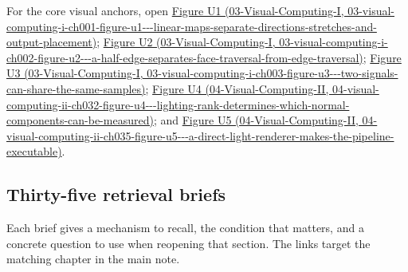 For the core visual anchors, open \href{../03-Visual-Computing-I/main.pdf\#nameddest=03-visual-computing-i-ch001-figure-u1---linear-maps-separate-directions-stretches-and-output-placement}{Figure U1 (03-Visual-Computing-I, 03-visual-computing-i-ch001-figure-u1-\/-\/-linear-maps-separate-directions-stretches-and-output-placement)}; \href{../03-Visual-Computing-I/main.pdf\#nameddest=03-visual-computing-i-ch002-figure-u2---a-half-edge-separates-face-traversal-from-edge-traversal}{Figure U2 (03-Visual-Computing-I, 03-visual-computing-i-ch002-figure-u2-\/-\/-a-half-edge-separates-face-traversal-from-edge-traversal)}; \href{../03-Visual-Computing-I/main.pdf\#nameddest=03-visual-computing-i-ch003-figure-u3---two-signals-can-share-the-same-samples}{Figure U3 (03-Visual-Computing-I, 03-visual-computing-i-ch003-figure-u3-\/-\/-two-signals-can-share-the-same-samples)}; \href{../04-Visual-Computing-II/main.pdf\#nameddest=04-visual-computing-ii-ch032-figure-u4---lighting-rank-determines-which-normal-components-can-be-measured}{Figure U4 (04-Visual-Computing-II, 04-visual-computing-ii-ch032-figure-u4-\/-\/-lighting-rank-determines-which-normal-components-can-be-measured)}; and \href{../04-Visual-Computing-II/main.pdf\#nameddest=04-visual-computing-ii-ch035-figure-u5---a-direct-light-renderer-makes-the-pipeline-executable}{Figure U5 (04-Visual-Computing-II, 04-visual-computing-ii-ch035-figure-u5-\/-\/-a-direct-light-renderer-makes-the-pipeline-executable)}.

\subsection{Thirty-five retrieval briefs}\label{appendix-a8f634b076b5-thirty-five-retrieval-briefs}

Each brief gives a mechanism to recall, the condition that matters, and a concrete question to use when reopening that section. The links target the matching chapter in the main note.

